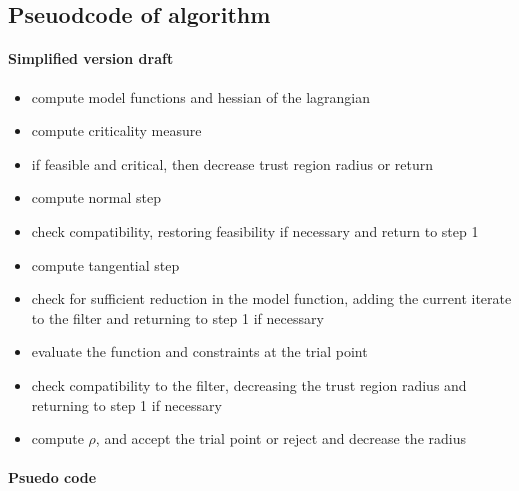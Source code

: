 \documentclass{article}
\begin{document}
\subsection{Pseuodcode of algorithm}

\paragraph{Simplified version draft}

\begin{itemize}
\item compute model functions and hessian of the lagrangian
\item compute criticality measure
\item if feasible and critical, then decrease trust region radius or return
\item compute normal step
\item check compatibility, restoring feasibility if necessary and return to step 1
\item compute tangential step
\item check for sufficient reduction in the model function, adding the current iterate to the filter and returning to step 1 if necessary
\item evaluate the function and constraints at the trial point
\item check compatibility to the filter, decreasing the trust region radius and returning to step 1 if necessary
\item compute $\rho$, and accept the trial point or reject and decrease the radius
\end{itemize}

\paragraph{Psuedo code}
\end{document}
